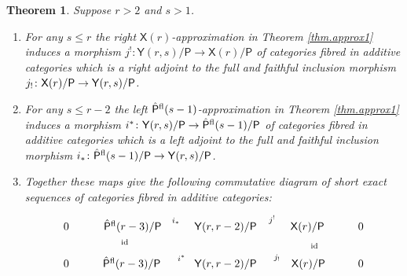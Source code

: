 \documentclass[a4paper,10pt]{amsart}
\theoremstyle{plain}
\newtheorem{thm}[xx]{Theorem}%
\theoremstyle{definition}
\theoremstyle{remark}
\numberwithin{equation}{xx}
\DeclareMathOperator{\id}{id}
\newcommand{\co}{\colon}
\newcommand{\ra}{\rightarrow}
\newcommand{\Pf}{\hat{\cat{P}}{}^{\textnormal{fl}}}
\renewcommand{\leq}{\leqslant}
\newcommand{\cat}[1]{\mathsf{{#1}}}
\begin{document}
\begin{thm}\label{thm.approx2} Suppose \(r>2\) and \(s>1\)\textup{.} 
\begin{enumerate}
\item[(i)] For any \(s\leq r\) the right \(\cat{X}(r)\)-approximation in \textup{Theorem \ref{thm.approx1}} induces a morphism \(j^{!}\co \cat{Y}(r,s)/\cat{P}\ra\cat{X}(r)/\cat{P}\) of categories fibred in additive categories which is a right adjoint to the full and faithful inclusion morphism \(j_{!}\co \cat{X}(r)/\cat{P}\linebreak[1]\ra\cat{Y}(r,s)/\cat{P}\)\textup{.}
\item[(ii)] For any \(s\leq r-2\) the left \(\Pf(s-1)\)-approximation in \textup{Theorem \ref{thm.approx1}} induces a morphism \(i^{*}\co \cat{Y}(r,s)/\cat{P}\ra\Pf(s-1)/\cat{P}\) of categories fibred in additive categories which is a left adjoint to the full and faithful inclusion morphism \(i_{*}\co \Pf(s-1)/\cat{P}\ra \cat{Y}(r,s)/\cat{P}\)\textup{.}
\item[(iii)] Together these maps give the following commutative diagram of short exact sequences of categories fibred in additive categories\textup{:}
\begin{equation*}
\xymatrix@C-0pt@R-8pt@H-30pt{
0\ar[r] & \, \Pf(r-3)/\cat{P} \ar[r]^(0.47){i_{*}}\ar[d]_(0.4){\id} & \cat{Y}(r,r-2)/\cat{P}\ar[r]^(0.57){j^{!}}\ar@{=}[d] & \cat{X}(r)/\cat{P} \ar[r] & 0 \\
0 & \Pf(r-3)/\cat{P}\ar[l] & \cat{Y}(r,r-2)/\cat{P}\ar[l]_(0.47){i^{*}} & \,  \cat{X}(r)/\cat{P}  \ar[l]_(0.37){j_{!}}\ar[u]_{\id} & 0 \ar[l]
}
\end{equation*}
\end{enumerate}
\end{thm}
\end{document}
